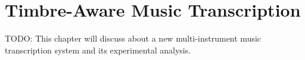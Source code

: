 
\graphicspath{{7-timbre/figures/}}

\chapter{Timbre-Aware Music Transcription}
\label{ch:timbre}

TODO: This chapter will discuss about a new multi-instrument music transcription system and its experimental analysis.